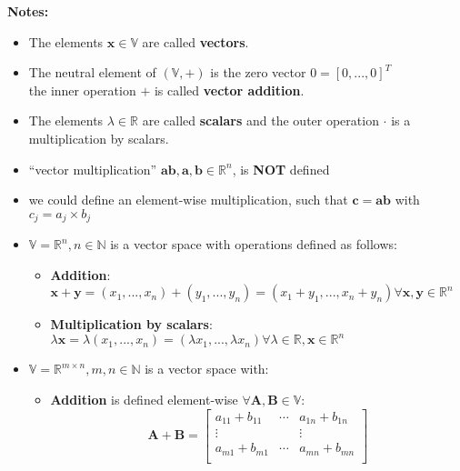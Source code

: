 \textbf{Notes:}
\begin{itemize}
    \item The elements $\mathbf{x}\in\mathbb{V}$ are called \textbf{vectors}\label{vectors}.

    \item The neutral element of $(\mathbb{V}, +)$ is the zero vector $0 = [0, ..., 0]^T$ \\
    the inner operation $+$ is called \textbf{vector addition}\label{vector addition}.

    \item The elements $\lambda\in\mathbb{R}$ are called \textbf{scalars}\label{scalars} and the outer operation $\cdot$ is a multiplication by scalars.

    \item “vector multiplication” $\mathbf{ab, a, b} \in \mathbb{R}^n$, is \textbf{NOT} defined

    \item we could define an element-wise multiplication, such that $\mathbf{c = ab}$ with $c_j = a_j \times b_j$

    \item $\mathbb{V} = \mathbb{R}^n, n \in \mathbb{N}$ is a vector space with operations defined as follows:
    \begin{itemize}
        \item \textbf{Addition}:\\ $\mathbf{x+y} = (x_1, ..., x_n)+(y_1, ..., y_n) = (x_1+y_1, ..., x_n+y_n) \forall \mathbf{x, y} \in \mathbb{R}^n$

        \item \textbf{Multiplication by scalars}:\\ $\lambda\mathbf{x} = \lambda(x_1, ..., x_n) = (\lambda x_1, ..., \lambda x_n) \forall \lambda \in \mathbb{R}, \mathbf{x} \in \mathbb{R}^n$
        
    \end{itemize}

    \item $\mathbb{V} = \mathbb{R}^{m\times n}, m, n \in \mathbb{N}$ is a vector space with:
    \begin{itemize}
        \item \textbf{Addition} is defined element-wise $\forall \mathbf{A, B} \in \mathbb{V}$: 
        \[
            \mathbf{A + B} = \begin{bmatrix}
                a_{11} + b_{11} & \cdots & a_{1n} + b_{1n} \\
                \vdots & & \vdots \\
                a_{m1} + b_{m1} & \cdots & a_{mn} + b_{mn} \\
            \end{bmatrix}
        \]


\end{itemize}
\end{itemize}
